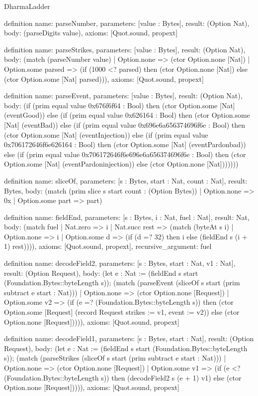 \begin{lexlean}{DharmaLadder}
\begin{semanticmodule}
definition{
  name: parseNumber,
  parameters: [value : Bytes],
  result: (Option Nat),
  body: (parseDigits value),
  axioms: [Quot.sound, propext]
}

definition{
  name: parseStrikes,
  parameters: [value : Bytes],
  result: (Option Nat),
  body: (match (parseNumber value)
    | Option.none => (ctor Option.none [Nat])
    | Option.some parsed => (if (1000 <? parsed) then (ctor Option.none [Nat]) else (ctor Option.some [Nat] parsed))),
  axioms: [Quot.sound, propext]
}

definition{
  name: parseEvent,
  parameters: [value : Bytes],
  result: (Option Nat),
  body: (if (prim equal value 0x676f6f64 : Bool) then (ctor Option.some [Nat] (eventGood)) else (if (prim equal value 0x626164 : Bool) then (ctor Option.some [Nat] (eventBad)) else (if (prim equal value 0x696e6a656374696f6e : Bool) then (ctor Option.some [Nat] (eventInjection)) else (if (prim equal value 0x706172646f6e626164 : Bool) then (ctor Option.some [Nat] (eventPardonbad)) else (if (prim equal value 0x706172646f6e696e6a656374696f6e : Bool) then (ctor Option.some [Nat] (eventPardoninjection)) else (ctor Option.none [Nat]))))))
}

definition{
  name: sliceOf,
  parameters: [s : Bytes, start : Nat, count : Nat],
  result: Bytes,
  body: (match (prim slice s start count : (Option Bytes))
    | Option.none => 0x
    | Option.some part => part)
}

definition{
  name: fieldEnd,
  parameters: [s : Bytes, i : Nat, fuel : Nat],
  result: Nat,
  body: (match fuel
    | Nat.zero => i
    | Nat.succ rest => (match (byteAt s i)
      | Option.none => i
      | Option.some d => (if (d =? 32) then i else (fieldEnd s (i + 1) rest)))),
  axioms: [Quot.sound, propext],
  recursive_argument: fuel
}

definition{
  name: decodeField2,
  parameters: [s : Bytes, start : Nat, v1 : Nat],
  result: (Option Request),
  body: (let e : Nat := (fieldEnd s start (Foundation.Bytes::byteLength s)); (match (parseEvent (sliceOf s start (prim subtract e start : Nat)))
    | Option.none => (ctor Option.none [Request])
    | Option.some v2 => (if (e =? (Foundation.Bytes::byteLength s)) then (ctor Option.some [Request] (record Request {strikes := v1, event := v2})) else (ctor Option.none [Request])))),
  axioms: [Quot.sound, propext]
}

definition{
  name: decodeField1,
  parameters: [s : Bytes, start : Nat],
  result: (Option Request),
  body: (let e : Nat := (fieldEnd s start (Foundation.Bytes::byteLength s)); (match (parseStrikes (sliceOf s start (prim subtract e start : Nat)))
    | Option.none => (ctor Option.none [Request])
    | Option.some v1 => (if (e <? (Foundation.Bytes::byteLength s)) then (decodeField2 s (e + 1) v1) else (ctor Option.none [Request])))),
  axioms: [Quot.sound, propext]
}


\end{semanticmodule}
\end{lexlean}
